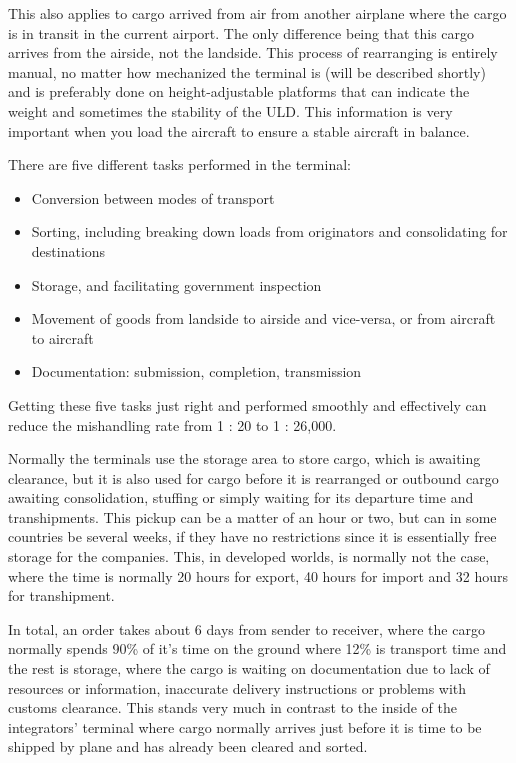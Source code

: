 This also applies to cargo arrived from air from another airplane where the cargo is in transit in the current airport. The only difference being that this cargo arrives from the airside, not the landside.
This process of rearranging is entirely manual, no matter how mechanized the terminal is (will be described shortly) and is preferably done on height-adjustable platforms that can indicate the weight and sometimes the stability of the ULD. This information is very important when you load the aircraft to ensure a stable aircraft in balance.


There are five different tasks performed in the terminal:
\begin{itemize}
\item Conversion between modes of transport
\item Sorting, including breaking down loads from originators and consolidating for destinations
\item Storage, and facilitating government inspection
\item Movement of goods from landside to airside and vice-versa, or from aircraft to aircraft
\item Documentation: submission, completion, transmission
\end{itemize}

Getting these five tasks just right and performed smoothly and effectively can reduce the mishandling rate from 1 : 20 to 1 : 26,000.

Normally the terminals use the storage area to store cargo, which is awaiting clearance, but it is also used for cargo before it is rearranged or outbound cargo awaiting consolidation, stuffing or simply waiting for its departure time and transhipments. This pickup can be a matter of an hour or two, but can in some countries be several weeks, if they have no restrictions since it is essentially free storage for the companies. This, in developed worlds, is normally not the case, where the time is normally 20 hours for export, 40 hours for import and 32 hours for transhipment.

In total, an order takes about 6 days from sender to receiver, where the cargo normally spends 90\% of it's time on the ground where 12\% is transport time and the rest is storage, where the cargo is waiting on documentation due to lack of resources or information, inaccurate delivery instructions or problems with customs clearance. This stands very much in contrast to the inside of the integrators' terminal where cargo normally arrives just before it is time to be shipped by plane and has already been cleared and sorted.

